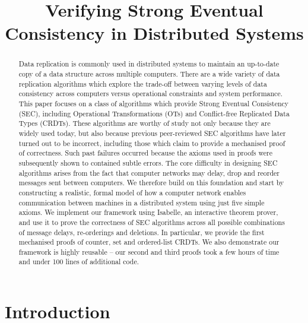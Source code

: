 \documentclass[acmlarge,review,anonymous]{acmart}\settopmatter{printfolios=true}
\begin{document}
\title{Verifying Strong Eventual Consistency in Distributed Systems}

\begin{abstract}
Data replication is commonly used in distributed systems to maintain an up-to-date copy of a data structure across multiple computers. There are a wide variety of data replication algorithms which explore the trade-off between varying levels of data consistency across computers versus operational constraints and system performance. This paper focuses on a class of algorithms which provide Strong Eventual Consistency (SEC), including Operational Transformations (OTs) and Conflict-free Replicated Data Types (CRDTs). These algorithms are worthy of study not only because they are widely used today, but also because previous peer-reviewed SEC algorithms have later turned out to be incorrect, including those which claim to provide a mechanised proof of correctness. Such past failures occurred because the axioms used in proofs were subsequently shown to contained subtle errors. The core difficulty in designing SEC algorithms arises from the fact that computer networks may delay, drop and reorder messages sent between computers. We therefore build on this foundation and start by constructing a realistic, formal model of how a computer network enables communication between machines in a distributed system using just five simple axioms. We implement our framework using Isabelle, an interactive theorem prover, and use it to prove the correctness of SEC algorithms across all possible combinations of message delays, re-orderings and deletions. In particular, we provide the first mechanised proofs of counter, set and ordered-list CRDTs. We also demonstrate our framework is highly reusable -- our second and third proofs took a few hours of time and under 100 lines of additional code.
\end{abstract}
\maketitle



\section{Introduction}
\label{sect.introduction}
\end{document}
